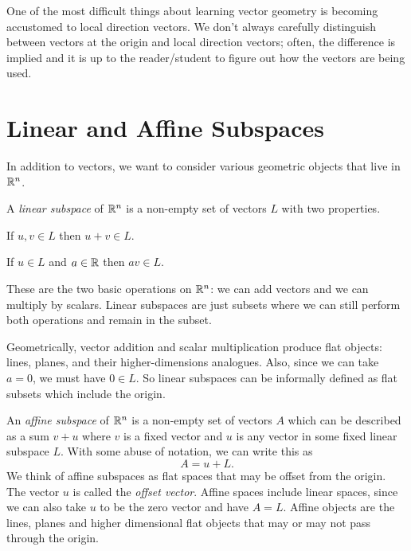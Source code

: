 \documentclass[fleqn,letterpaper]{report}
\begin{document}
One of the most difficult things about learning vector geometry
is becoming accustomed to local direction vectors. We don't
always carefully distinguish between vectors at the origin and
local direction vectors; often, the difference is implied and
it is up to the reader/student to figure out how the vectors
are being used. 

\section{Linear and Affine Subspaces}
\label{subspaces}

In addition to vectors, we want to consider various geometric
objects that live in $\mathbb{R}^n$.

\begin{defn}
A \emph{linear subspace} of $\mathbb{R}^n$ is a non-empty set of
vectors $L$ with two properties. 
\begin{smallitemize}
\item If $u,v \in L$ then $u+v \in L$.
\item If $u \in L$ and $a \in \mathbb{R}$ then $av \in L$.
\end{smallitemize}
\end{defn}

These are the two basic operations on $\mathbb{R}^n$:
we can add vectors and we can multiply by scalars. Linear
subspaces are just subsets where we can still perform both
operations and remain in the subset.

Geometrically, vector addition and scalar multiplication
produce flat objects: lines, planes, and their 
higher-dimensions analogues. Also, since we can take
$a=0$, we must have $0 \in L$. So linear subspaces can be
informally defined as flat subsets which include the origin.

\begin{defn}
An \emph{affine subspace} of $\mathbb{R}^n$ is a non-empty set of
vectors $A$ which can be described as a sum $v+u$ where $v$ is
a fixed vector and $u$ is any vector in some fixed linear
subspace $L$. With some abuse of notation, we can write this
as
\begin{equation*}
A = u + L.
\end{equation*}
We think of affine subspaces as flat spaces that
may be offset from the origin. The vector $u$ is called the
\emph{offset vector}. Affine spaces include linear spaces,
since we can also take $u$ to be the zero vector and have
$A=L$. Affine objects are the lines, planes and higher
dimensional flat objects that may or may not pass through the
origin.
\end{defn}
\end{document}
